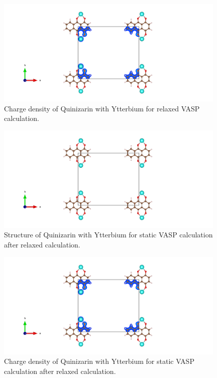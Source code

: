 \documentclass{article}
\begin{document}
  \begin{figure}[H]
      \centering
      \includegraphics[width = 11cm]{../fig/Yb_relax_CHGCAR.png}
      \caption{Charge density of Quinizarin with Ytterbium for relaxed VASP calculation. }
      \label{fig:Yb_relax_CHGCAR}
  \end{figure}

  \begin{figure}[H]
      \centering
      \includegraphics[width = 11cm]{../fig/Yb_staticafter_CONTCAR.png}
      \caption{Structure of Quinizarin with Ytterbium for static VASP calculation after relaxed calculation. }
      \label{fig:Yb_staticafter_CONTCAR}
  \end{figure}

  \begin{figure}[H]
      \centering
      \includegraphics[width = 11cm]{../fig/Yb_staticafter_CHGCAR.png}
      \caption{Charge density of Quinizarin with Ytterbium for static VASP calculation after relaxed calculation. }
      \label{fig:Yb_staticafter_CHGCAR}
  \end{figure}
\end{document}
